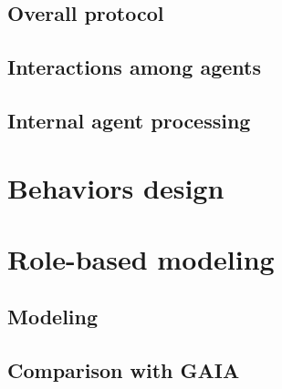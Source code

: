 \documentclass[a4paper,11pt]{report}
\begin{document}
  
  \subsection{Overall protocol} %
  
  
  \subsection{Interactions among agents}
  
  
  \subsection{Internal agent processing}


  
  
  \section{Behaviors design} %
  

  
  
  \clearpage %
  
  \section{Role-based modeling} %
  
  \subsection{Modeling}
  
  \subsection{Comparison with GAIA}
\end{document}
